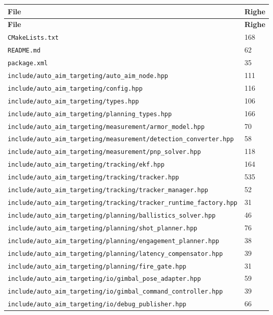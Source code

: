 \documentclass[11pt,a4paper]{article}
\newcommand{\code}[1]{\texttt{#1}}
\begin{document}
\begingroup
\scriptsize
\begin{longtable}{p{} p{}}
\toprule
\textbf{File} & \textbf{Righe} \\
\midrule
\endfirsthead
\toprule
\textbf{File} & \textbf{Righe} \\
\midrule
\endhead
\code{CMakeLists.txt} & 168 \\
\code{README.md} & 62 \\
\code{package.xml} & 35 \\
\code{include/auto\_aim\_targeting/auto\_aim\_node.hpp} & 111 \\
\code{include/auto\_aim\_targeting/config.hpp} & 116 \\
\code{include/auto\_aim\_targeting/types.hpp} & 106 \\
\code{include/auto\_aim\_targeting/planning\_types.hpp} & 166 \\
\code{include/auto\_aim\_targeting/measurement/armor\_model.hpp} & 70 \\
\code{include/auto\_aim\_targeting/measurement/detection\_converter.hpp} & 58 \\
\code{include/auto\_aim\_targeting/measurement/pnp\_solver.hpp} & 118 \\
\code{include/auto\_aim\_targeting/tracking/ekf.hpp} & 164 \\
\code{include/auto\_aim\_targeting/tracking/tracker.hpp} & 535 \\
\code{include/auto\_aim\_targeting/tracking/tracker\_manager.hpp} & 52 \\
\code{include/auto\_aim\_targeting/tracking/tracker\_runtime\_factory.hpp} & 31 \\
\code{include/auto\_aim\_targeting/planning/ballistics\_solver.hpp} & 46 \\
\code{include/auto\_aim\_targeting/planning/shot\_planner.hpp} & 76 \\
\code{include/auto\_aim\_targeting/planning/engagement\_planner.hpp} & 38 \\
\code{include/auto\_aim\_targeting/planning/latency\_compensator.hpp} & 39 \\
\code{include/auto\_aim\_targeting/planning/fire\_gate.hpp} & 31 \\
\code{include/auto\_aim\_targeting/io/gimbal\_pose\_adapter.hpp} & 59 \\
\code{include/auto\_aim\_targeting/io/gimbal\_command\_controller.hpp} & 39 \\
\code{include/auto\_aim\_targeting/io/debug\_publisher.hpp} & 66 \\

\end{longtable}
\end{document}
